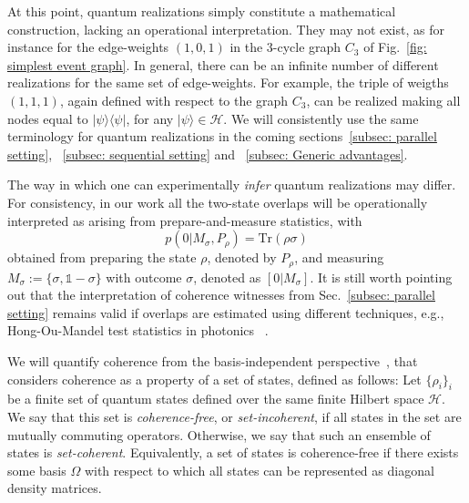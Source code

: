 \documentclass[letterpaper,onecolumn,12pt,accepted=2024-01-17]{article}
\begin{document}
{At this point, quantum realizations simply constitute a mathematical construction, lacking an operational interpretation. They may not exist, as for instance for the edge-weights $(1,0,1)$ in the $3$-cycle graph $C_3$ of Fig.~\ref{fig: simplest event graph}. In general, there can be an infinite number of different realizations for the same set of edge-weights. For example, the triple of weigths $(1,1,1)$, again defined with respect to the graph $C_3$, can be realized making all  nodes equal to $\vert \psi \rangle \langle \psi \vert $, for any $\vert \psi \rangle \in \mathcal{H}$. We will consistently use the same terminology for quantum realizations in the coming sections~\ref{subsec: parallel setting}, ~\ref{subsec: sequential setting} and ~\ref{subsec: Generic advantages}.

The way in which one can experimentally \textit{infer} quantum realizations may differ. For consistency, in our work all the two-state overlaps will be operationally interpreted as arising from prepare-and-measure statistics, with 
\begin{equation*}
p(0|M_\sigma,P_\rho) = \text{Tr}(\rho \sigma)
\end{equation*} obtained from preparing the state $\rho$, denoted by $P_\rho$, and measuring $M_\sigma := \{\sigma, \mathbb{1}-\sigma\}$ with outcome $\sigma$, denoted as $[0|M_\sigma]$. It is still worth pointing out that the interpretation of coherence witnesses from Sec.~\ref{subsec: parallel setting} remains valid if overlaps are estimated using different techniques, e.g., Hong-Ou-Mandel test statistics in photonics ~\cite{giordani2021witnessesofcoherence}.}

{We will quantify coherence from the basis-independent perspective~\cite{designolle2021set,galvaobroad2020quantumandclassical}, that considers coherence as a property of a set of states, defined as follows: Let $\{\rho_i\}_i$ be a finite set of quantum states defined over the same finite Hilbert space $\mathcal{H}$. We say that this set is \textit{coherence-free}, or \textit{set-incoherent}, if all states in the set are mutually commuting operators. Otherwise, we say that such an ensemble of states is \textit{set-coherent}. Equivalently, a set of states is coherence-free if there exists some basis $\Omega$ with respect to which all states can be represented as diagonal density matrices.
}
\end{document}
